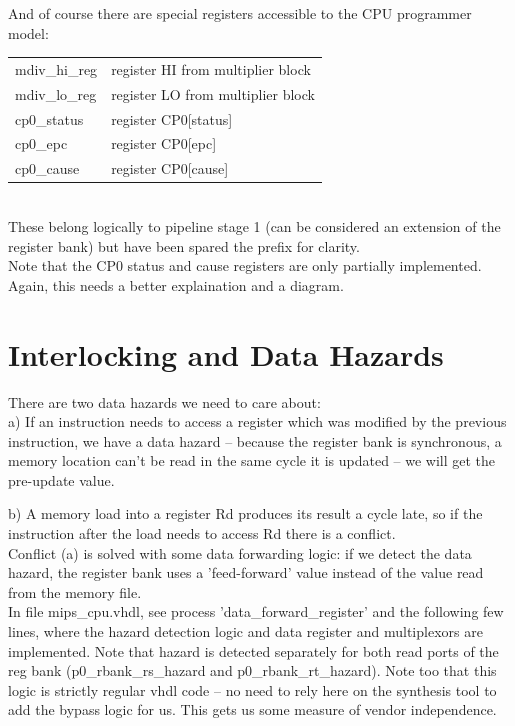     
    And of course there are special registers accessible to the CPU programmer 
    model:\\
    
    \begin{tabular}{ p{4cm} l }
        mdiv\_hi\_reg     & register HI from multiplier block\\
        mdiv\_lo\_reg     & register LO from multiplier block\\
        cp0\_status      & register CP0[status]\\
        cp0\_epc         & register CP0[epc]\\
        cp0\_cause       & register CP0[cause]
    \end{tabular}\\
    
    These belong logically to pipeline stage 1 (can be considered an extension
    of the register bank) but have been spared the prefix for clarity.\\

    Note that the CP0 status and cause registers are only partially implemented.\\

    Again, this needs a better explaination and a diagram.\\


\section{Interlocking and Data Hazards}
\label{interlocking_and_data_hazards}

    There are two data hazards we need to care about:\\
    
    a) If an instruction needs to access a register which was modified by the
    previous instruction, we have a data hazard -- because the register bank is
    synchronous, a memory location can't be read in the same cycle it is updated
    -- we will get the pre-update value.
    
    b) A memory load into a register Rd produces its result a cycle late, so if
    the instruction after the load needs to access Rd there is a conflict.\\


    Conflict (a) is solved with some data forwarding logic: if we detect the
    data hazard, the register bank uses a 'feed-forward' value instead of the
    value read from the memory file. \\
    In file mips\_cpu.vhdl, see process 'data\_forward\_register' and the following
    few lines, where the hazard detection logic and data register and 
    multiplexors are implemented. Note that hazard is detected separately for
    both read ports of the reg bank (p0\_rbank\_rs\_hazard and p0\_rbank\_rt\_hazard).
    Note too that this logic is strictly regular vhdl code -- no need to rely here
    on the synthesis tool to add the bypass logic for us. This gets us some
    measure of vendor independence.\\
    
